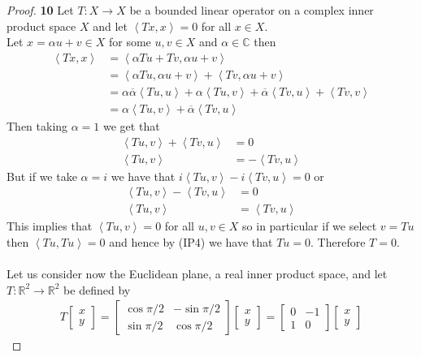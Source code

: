 \documentclass[11pt]{article}
\newcommand{\R}{\mathbb{R}}
\newcommand{\C}{\mathbb{C}}
\newcommand{\inprd}[1]{\left\langle{#1}\right\rangle}
\theoremstyle{definition}
\begin{document}
\cleardoublepage
\begin{proof}{\textbf{10}}
Let $T: X \to X$ be a bounded linear operator on a complex inner product space
$X$ and let $\inprd{Tx, x} = 0$ for all $x \in X$.
\\
Let $x = \alpha u + v \in X$ for some $u,v \in X$ and $\alpha \in \C$ then
\begin{align*}
    \inprd{Tx ,x} &= \inprd{\alpha Tu + Tv,\alpha u + v}\\
    &= \inprd{\alpha Tu, \alpha u + v} + \inprd{Tv,\alpha u + v}\\
    &= \alpha\overline{\alpha}\inprd{Tu, u} + \alpha\inprd{Tu, v}
    + \overline{\alpha}\inprd{Tv,u} + \inprd{Tv, v}\\
    &= \alpha\inprd{Tu, v} + \overline{\alpha}\inprd{Tv,u}
\end{align*}
Then taking $\alpha = 1$ we get that
\begin{align*}
    \inprd{Tu, v} + \inprd{Tv,u} &= 0\\
    \inprd{Tu, v} &= -\inprd{Tv,u} 
\end{align*}
But if we take $\alpha = i$ we have that $i\inprd{Tu, v} - i\inprd{Tv,u} = 0$
or
\begin{align*}
    \inprd{Tu, v} - \inprd{Tv,u} &= 0\\
    \inprd{Tu, v} &= \inprd{Tv,u}
\end{align*}
This implies that $\inprd{Tu, v} = 0$ for all $u,v \in X$ so in particular if
we select $v = Tu$ then $\inprd{Tu, Tu} = 0$ and hence by (IP4) we have that
$Tu = 0$. Therefore $T = 0$.
\\\\
Let us consider now the Euclidean plane, a real inner product space, and let
$T: \R^2 \to \R^2$ be defined by
\begin{align*}
    T\begin{bmatrix} x \\y \end{bmatrix}
    = \begin{bmatrix}
        \cos\pi/2 & -\sin\pi/2\\
        \sin\pi/2 & \cos\pi/2
    \end{bmatrix}\begin{bmatrix} x \\y \end{bmatrix}
    = \begin{bmatrix}
        0 & -1\\ 1 & 0
    \end{bmatrix}\begin{bmatrix} x \\y \end{bmatrix}

\end{align*}
\end{proof}
\end{document}
